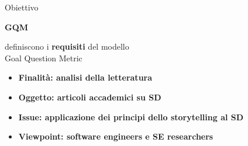 \documentclass{beamer}
\begin{document}
\begin{frame}[t]
{\centerline{Obiettivo}}
  \centering
  {\fontsize{30}{22}\textbf{\textcolor{myyellow}{GQM}}}
  \vspace{1.5}
      \begin{minipage}{\linewidth}
      \vspace{0.5cm}
      \centering
        \citet{caldiera1994goal} definiscono i \textbf{\textcolor{myred}{requisiti}} del modello\\ Goal Question Metric
        \vspace{0.6cm}
\begin{itemize}[itemsep=1\baselineskip]
    \item {\fontsize{10}{12}\textbf{\textcolor{myred}{Finalità}: analisi della letteratura}}
    \item {\fontsize{10}{12}\textbf{\textcolor{myred}{Oggetto}: articoli accademici su SD}}
    \item {\fontsize{10}{12}\textbf{\textcolor{myred}{Issue}: applicazione dei principi dello storytelling al SD}}
    \item {\fontsize{10}{12}\textbf{\textcolor{myred}{Viewpoint}: software engineers e SE researchers}}
\end{itemize}
      \end{minipage}
\end{frame}
\end{document}
